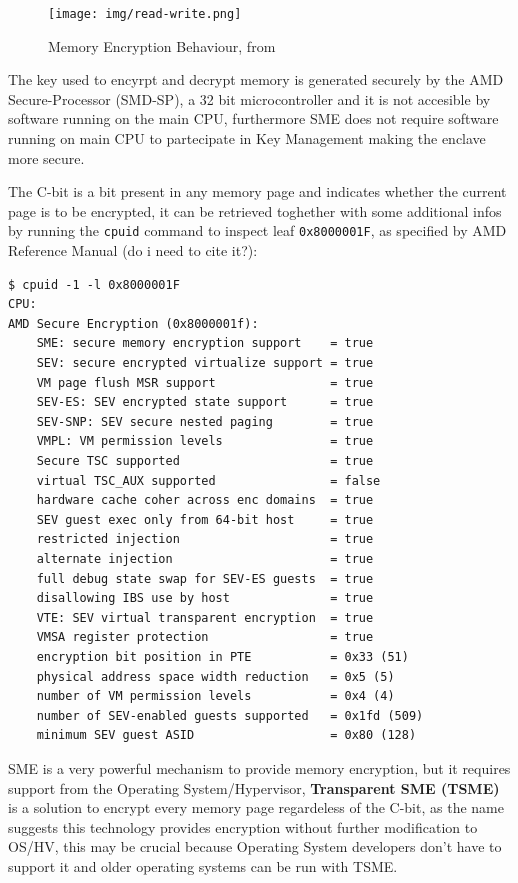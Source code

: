 \documentclass[twocolumn]{article}
\begin{document}
\begin{figure}
    \centering
    \texttt{[image: img/read-write.png]}
    \caption{Memory Encryption Behaviour, from \cite{memory-encryption}}
\end{figure}

The key used to encyrpt and decrypt memory is generated securely by the AMD Secure-Processor (SMD-SP), a 32 bit microcontroller and it is not accesible by software running on the main CPU, furthermore SME does not require software running on main CPU to partecipate in Key Management making the enclave more secure.

The C-bit is a bit present in any memory page and indicates whether the current page is to be encrypted, it can be retrieved toghether with some additional infos by running the \texttt{cpuid} command to inspect leaf \texttt{0x8000001F}, as specified by AMD Reference Manual (do i need to cite it?):

\begin{verbatim}
$ cpuid -1 -l 0x8000001F
CPU:
AMD Secure Encryption (0x8000001f):
    SME: secure memory encryption support    = true
    SEV: secure encrypted virtualize support = true
    VM page flush MSR support                = true
    SEV-ES: SEV encrypted state support      = true
    SEV-SNP: SEV secure nested paging        = true
    VMPL: VM permission levels               = true
    Secure TSC supported                     = true
    virtual TSC_AUX supported                = false
    hardware cache coher across enc domains  = true
    SEV guest exec only from 64-bit host     = true
    restricted injection                     = true
    alternate injection                      = true
    full debug state swap for SEV-ES guests  = true
    disallowing IBS use by host              = true
    VTE: SEV virtual transparent encryption  = true
    VMSA register protection                 = true
    encryption bit position in PTE           = 0x33 (51)
    physical address space width reduction   = 0x5 (5)    
    number of VM permission levels           = 0x4 (4)
    number of SEV-enabled guests supported   = 0x1fd (509)
    minimum SEV guest ASID                   = 0x80 (128)
\end{verbatim}
    
SME is a very powerful mechanism to provide memory encryption, but it requires support from the Operating System/Hypervisor, \textbf{Transparent SME (TSME)} is a solution to encrypt every memory page regardeless of the C-bit, as the name suggests this technology provides encryption without further modification to OS/HV, this may be crucial because Operating System developers don't have to support it and older operating systems can be run with TSME.
\end{document}
